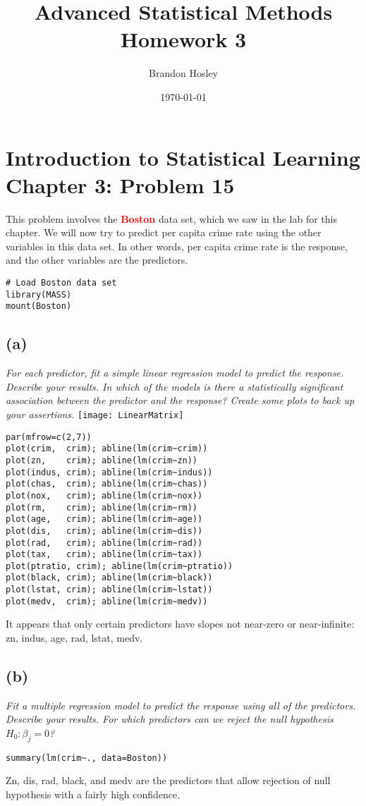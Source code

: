 \documentclass[a4paper,man,natbib]{apa6}
\title{Advanced Statistical Methods Homework 3}
\author{Brandon Hosley}
\date{\today}
\affiliation{University of Illinois - Springfield}
\begin{document}
\maketitle
\singlespacing

\section{Introduction to Statistical Learning \\ Chapter 3: Problem 15}
This problem involves the \textbf{\textcolor{red}{Boston}} data set, 
which we saw in the lab for this chapter. 
We will now try to predict per capita crime rate
using the other variables in this data set. 
In other words, per capita crime rate is the response, 
and the other variables are the predictors.

\begin{verbatim}
# Load Boston data set
library(MASS)
mount(Boston)
\end{verbatim}

\subsection{(a)} 
\emph{
	For each predictor, 
	fit a simple linear regression model to predict the response. 
	Describe your results. 
	In which of the models is there a statistically significant association
	between the predictor and the response? 
	Create some plots to back up your assertions.}
\texttt{[image: LinearMatrix]}
\begin{verbatim}
par(mfrow=c(2,7))
plot(crim,  crim); abline(lm(crim~crim)) 
plot(zn,    crim); abline(lm(crim~zn)) 
plot(indus, crim); abline(lm(crim~indus)) 
plot(chas,  crim); abline(lm(crim~chas))
plot(nox,   crim); abline(lm(crim~nox)) 
plot(rm,    crim); abline(lm(crim~rm))  
plot(age,   crim); abline(lm(crim~age))  
plot(dis,   crim); abline(lm(crim~dis))  
plot(rad,   crim); abline(lm(crim~rad))  
plot(tax,   crim); abline(lm(crim~tax))    
plot(ptratio, crim); abline(lm(crim~ptratio))
plot(black, crim); abline(lm(crim~black))
plot(lstat, crim); abline(lm(crim~lstat))
plot(medv,  crim); abline(lm(crim~medv))
\end{verbatim}

It appears that only certain predictors have slopes not near-zero or near-infinite:
zn, indus, age, rad, lstat, medv.

\subsection{(b)}
\emph{
	Fit a multiple regression model to predict the 
	response using all of the predictors. 
	Describe your results. 
	For which predictors can we reject the null hypothesis 
	$H_0 : \beta_j = 0$?
}
\begin{verbatim}
summary(lm(crim~., data=Boston))
\end{verbatim}
Zn, dis, rad, black, and medv are the predictors that allow rejection of null hypothesis with a fairly high confidence.
\end{document}
